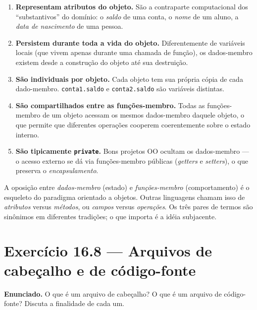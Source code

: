 \documentclass[11pt,a4paper]{article}
\begin{document}
\begin{enumerate}[leftmargin=*,itemsep=0pt]
  \item \textbf{Representam atributos do objeto.} S\~ao a contraparte computacional dos ``substantivos'' do dom\'inio: o \emph{saldo} de uma conta, o \emph{nome} de um aluno, a \emph{data de nascimento} de uma pessoa.
  \item \textbf{Persistem durante toda a vida do objeto.} Diferentemente de vari\'aveis locais (que vivem apenas durante uma chamada de fun\c{c}\~ao), os dados-membro existem desde a constru\c{c}\~ao do objeto at\'e sua destrui\c{c}\~ao.
  \item \textbf{S\~ao individuais por objeto.} Cada objeto tem sua pr\'opria c\'opia de cada dado-membro. \texttt{conta1.saldo} e \texttt{conta2.saldo} s\~ao vari\'aveis distintas.
  \item \textbf{S\~ao compartilhados entre as fun\c{c}\~oes-membro.} Todas as fun\c{c}\~oes-membro de um objeto acessam os mesmos dados-membro daquele objeto, o que permite que diferentes opera\c{c}\~oes cooperem coerentemente sobre o estado interno.
  \item \textbf{S\~ao tipicamente \texttt{private}.} Bons projetos OO ocultam os dados-membro --- o acesso externo se d\'a via fun\c{c}\~oes-membro p\'ublicas (\emph{getters} e \emph{setters}), o que preserva o \emph{encapsulamento}.
\end{enumerate}

\begin{obseng}
A oposi\c{c}\~ao entre \emph{dados-membro} (estado) e \emph{fun\c{c}\~oes-membro} (comportamento) \'e o esqueleto do paradigma orientado a objetos. Outras linguagens chamam isso de \emph{atributos} versus \emph{m\'etodos}, ou \emph{campos} versus \emph{opera\c{c}\~oes}. Os tr\^es pares de termos s\~ao sin\^onimos em diferentes tradi\c{c}\~oes; o que importa \'e a id\'eia subjacente.
\end{obseng}

\section{Exerc\'icio 16.8 --- Arquivos de cabe\c{c}alho e de c\'odigo-fonte}

\begin{enunciado}
\textbf{Enunciado.} O que \'e um arquivo de cabe\c{c}alho? O que \'e um arquivo de c\'odigo-fonte? Discuta a finalidade de cada um.
\end{enunciado}
\end{document}
